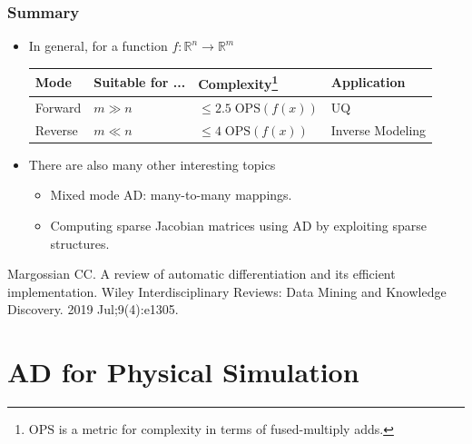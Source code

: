 \documentclass{beamer}
\newcommand{\RR}[0]{\mathbb{R}}
\begin{document}
\begin{frame}
	\frametitle{Summary}

	\begin{itemize}
		\item In general, for a function $f:\RR^n \rightarrow \RR^m$
		      \begin{table}[]
			      \centering
			      \begin{tabular}{@{}llll@{}}
				      \toprule
				      Mode    & Suitable for ... & Complexity\footnote{$\mathrm{OPS}$ is a metric for complexity in terms of fused-multiply adds.} & Application      \\ \midrule
				      Forward & $m\gg n$         & $\leq 2.5\;\mathrm{OPS}(f(x))$                                                                  & UQ               \\
				      Reverse & $m\ll n$         & $\leq 4\;\mathrm{OPS}(f(x))$                                                                    & Inverse Modeling \\ \bottomrule
			      \end{tabular}
		      \end{table}


		\item There are also many other interesting topics
		      \begin{itemize}
			      \item Mixed mode AD: many-to-many mappings.
			      \item Computing sparse Jacobian matrices using AD by exploiting sparse structures.
		      \end{itemize}
	\end{itemize}
	{\scriptsize Margossian CC. A review of automatic differentiation and its efficient implementation. Wiley Interdisciplinary Reviews: Data Mining and Knowledge Discovery. 2019 Jul;9(4):e1305.}
\end{frame}


\section{AD for Physical Simulation}
\end{document}
